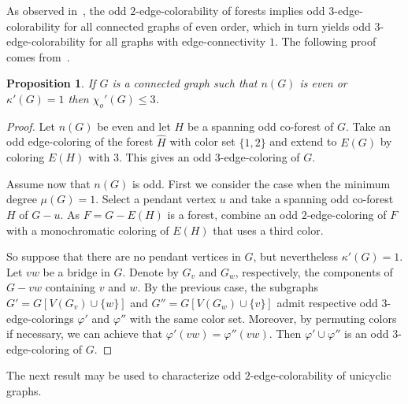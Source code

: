 \documentclass[a4paper,12pt]{article}
\newtheorem{proposition}[theorem]{Proposition}
\numberwithin{equation}{section}
\begin{document}
As observed in~\cite{Pyb91}, the odd $2$-edge-colorability of forests implies odd $3$-edge-colorability for all connected graphs of even order, which in turn yields odd $3$-edge-colorability for all graphs with edge-connectivity $1$. The following proof comes from~\cite{Pet18}.
\begin{proposition}
     \label{even order}
If $G$ is a connected graph such that $n(G)$ is even or $\kappa'(G)=1$ then $\chi_{o}'(G)\leq 3$.
\end{proposition}
\begin{proof}
 Let $n(G)$ be even and let $H$ be a spanning odd co-forest of $G$. Take an odd edge-coloring of the forest $\hat{H}$ with color set $\{1,2\}$ and extend to $E(G)$ by coloring $E(H)$ with $3$. This gives an odd $3$-edge-coloring of $G$.

Assume now that $n(G)$ is odd.
	First we consider the case when the minimum degree $\mu(G)=1$. Select a pendant vertex $u$ and take a spanning odd co-forest $H$ of $G-u$. As $F=G-E(H)$ is a forest, combine an odd $2$-edge-coloring of $F$ with a monochromatic coloring of $E(H)$ that uses a third color.
	
	So suppose that there are no pendant vertices in $G$, but nevertheless $\kappa'(G)=1$. Let $vw$ be a bridge in $G$. Denote by $G_{v}$ and $G_{w}$, respectively,
	the components of $G-vw$ containing $v$ and $w$.
	By the previous case, the subgraphs $G'=G[V(G_{v})\cup\{w\}]$ and $G''=G[V(G_{w})\cup\{v\}]$ admit respective odd $3$-edge-colorings $\varphi'$ and $\varphi''$ with the same color set.
	Moreover, by permuting colors if necessary, we can achieve that $\varphi'(vw)=\varphi''(vw)$.
	Then $\varphi' \cup \varphi''$ is an odd $3$-edge-coloring of $G$.
\end{proof}



The next result may be used to characterize odd $2$-edge-colorability of unicyclic graphs.
\end{document}
